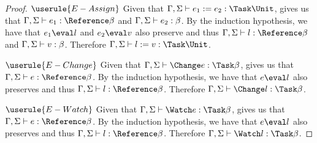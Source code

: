 \begin{proof}
  \case
    {$\userule{E-Assign}$}
    {Given that $\Gamma,\Sigma\infers e_1 := e_2 :\Task \Unit$,  gives us that $\Gamma,\Sigma\infers e_1:\Reference \beta$ and $\Gamma,\Sigma\vdash e_2:\beta$.
    By the induction hypothesis, we have that $e_1\eval l$ and $e_2\eval v$ also preserve and thus $\Gamma,\Sigma\infers l:\Reference \beta$ and $\Gamma,\Sigma\vdash v:\beta$.
    Therefore $\Gamma,\Sigma\infers l:=v:\Task \Unit$. }

  \case
    {$\userule{E-Change}$}
    {Given that $\Gamma,\Sigma\infers \Change e :\Task \beta$,  gives us that $\Gamma,\Sigma\infers e:\Reference \beta$.
    By the induction hypothesis, we have that $e\eval l$ also preserves and thus $\Gamma,\Sigma\infers l:\Reference \beta$.
    Therefore $\Gamma,\Sigma\infers \Change l:\Task\beta$.}

  \case
    {$\userule{E-Watch}$}
    {Given that $\Gamma,\Sigma\infers \Watch e :\Task \beta$,  gives us that $\Gamma,\Sigma\infers e:\Reference \beta$.
    By the induction hypothesis, we have that $e\eval l$ also preserves and thus $\Gamma,\Sigma\infers l:\Reference \beta$.
    Therefore $\Gamma,\Sigma\infers \Watch l:\Task\beta$.}
\end{proof}
